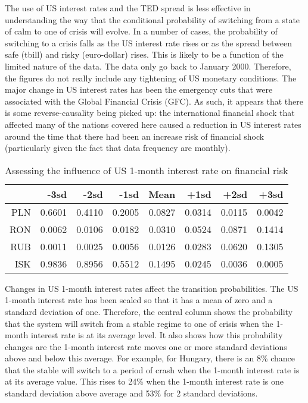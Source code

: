 \documentclass[12pt, a4paper, oneside]{article}\usepackage[]{graphicx}\usepackage[]{color}
\begin{document}
The use of US interest rates and the TED spread is less effective in understanding the way that the conditional probability of switching from a state of calm to one of crisis will evolve.  In a number of cases, the probability of switching to a crisis falls as the US interest rate rises or as the spread between safe (tbill) and risky (euro-dollar) rises. This is likely to be a function of the limited nature of the data. The data only go back to January 2000.  Therefore, the figures do not really include any tightening of US monetary conditions.  The major change in US interest rates has been the emergency cuts that were associated with the Global Financial Crisis (GFC). As such, it appears that there is some reverse-causality being picked up: the international financial shock that affected many of the nations covered here caused a reduction in US interest rates around the time that there had been an increase risk of financial shock (particularly given the fact that data frequency are monthly). 
\begin{table}[t]
\begin{threeparttable}
\centering
\begin{tabular}{rrrrrrrr}
  \hline
 & -3sd & -2sd & -1sd & Mean & +1sd & +2sd & +3sd \\ 
  \hline
  PLN & 0.6601 & 0.4110 & 0.2005 & 0.0827 & 0.0314 & 0.0115 & 0.0042 \\
  RON & 0.0062 & 0.0106 & 0.0182 & 0.0310 & 0.0524 & 0.0871 & 0.1414 \\ 
  RUB & 0.0011 & 0.0025 & 0.0056 & 0.0126 & 0.0283 & 0.0620 & 0.1305 \\
  ISK & 0.9836 & 0.8956 & 0.5512 & 0.1495 & 0.0245 & 0.0036 & 0.0005 \\
   \hline
\end{tabular}
\begin{tablenotes}
\small
\item Changes in US 1-month interest rates affect the transition probabilities.  The US 1-month interest rate has been scaled so that it has a mean of zero and a standard deviation of one.  Therefore, the central column shows the probability that the system will switch from a stable regime to one of crisis when the 1-month interest rate is at its average level.  It also shows how this probability changes are the 1-month interest rate moves one or more standard deviations above and below this average. For example, for Hungary, there is an 8\% chance that the stable will switch to a period of crash when the 1-month interest rate is at its average value.  This rises to 24\% when the 1-month interest rate is one standard deviation above average and 53\% for 2 standard deviations.  
\end{tablenotes}
\caption{Assessing the influence of US 1-month interest rate on financial risk} 
\label{tabref:1mtranprob}
\end{threeparttable}
\end{table}
\end{document}
